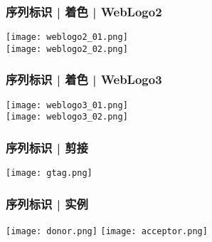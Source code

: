 \begin{frame}
  \frametitle{序列标识 | 着色 | WebLogo2}
  \begin{center}
    \texttt{[image: weblogo2\_01.png]}\\
    \vspace{1em}
    \texttt{[image: weblogo2\_02.png]}
  \end{center}
\end{frame}

\begin{frame}
  \frametitle{序列标识 | 着色 | WebLogo3}
  \begin{center}
    \texttt{[image: weblogo3\_01.png]}\\
    \vspace{1em}
    \texttt{[image: weblogo3\_02.png]}
  \end{center}
\end{frame}

\begin{frame}
  \frametitle{序列标识 | 剪接}
  \begin{center}
    \texttt{[image: gtag.png]}
  \end{center}
\end{frame}

\begin{frame}
  \frametitle{序列标识 | 实例}
  \begin{center}
    \texttt{[image: donor.png]}
    \vspace{0.5cm}
    \texttt{[image: acceptor.png]}
  \end{center}
\end{frame}

